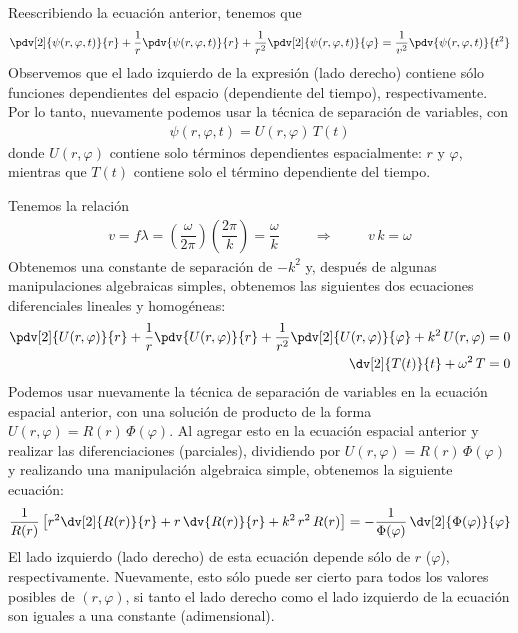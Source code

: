 Reescribiendo la ecuación anterior, tenemos que
\begin{align*}
\pdv[2]{\psi (r, \varphi, t)}{r} + \dfrac{1}{r} \pdv{\psi (r, \varphi, t)}{r} + \dfrac{1}{r^{2}} \pdv[2]{\psi (r, \varphi, t)}{\varphi} = \dfrac{1}{v^{2}} \pdv{\psi (r, \varphi, t)}{t^{2}}
\end{align*}
Observemos que el lado izquierdo de la expresión (lado derecho) contiene sólo funciones dependientes del espacio (dependiente del tiempo), respectivamente. Por lo tanto, nuevamente podemos usar la técnica de separación de variables, con
\begin{align*}
\psi (r, \varphi, t) = U(r, \varphi) \, T(t)
\end{align*}
donde $U(r, \varphi)$ contiene solo términos dependientes espacialmente: $r$ y $\varphi$, mientras que $T (t)$ contiene solo el término dependiente del tiempo.
\par
Tenemos la relación 
\begin{align*}
v = f \lambda = \left( \dfrac{\omega}{2 \pi} \right) \left( \dfrac{2 \pi}{k} \right) = \dfrac{\omega}{k} \hspace{1cm} \Longrightarrow \hspace{1cm} v \, k = \omega
\end{align*}
Obtenemos una constante de separación de $-k^{2}$ y, después de algunas manipulaciones algebraicas simples, obtenemos las siguientes dos ecuaciones diferenciales lineales y homogéneas:
\begin{align*}
\pdv[2]{U (r, \varphi)}{r} + \dfrac{1}{r} \pdv{U (r, \varphi)}{r} + \dfrac{1}{r^{2}} \pdv[2]{U (r, \varphi)}{\varphi} + k^{2} \, U (r, \varphi) &= 0 \\
\dv[2]{T(t)}{t} + \omega^{2} \, T &= 0 
\end{align*}
Podemos usar nuevamente la técnica de separación de variables en la ecuación espacial anterior, con una solución de producto de la forma $U (r, \varphi) = R (r) \, \Phi (\varphi)$. Al agregar esto en la ecuación espacial anterior y realizar las diferenciaciones (parciales), dividiendo por $U (r, \varphi) = R (r) \, \Phi (\varphi)$ y realizando una manipulación algebraica simple, obtenemos la siguiente ecuación:
\begin{align*}
\dfrac{1}{R(r)} \left[ r^{2} \dv[2]{R(r)}{r} + r \, \dv{R(r)}{r} + k^{2} \, r^{2} \, R(r) \right] = - \dfrac{1}{\Phi(\varphi)} \, \dv[2]{\Phi(\varphi)}{\varphi}
\end{align*}
El lado izquierdo (lado derecho) de esta ecuación depende sólo de $r$ ($\varphi$), respectivamente. Nuevamente, esto sólo puede ser cierto para todos los valores posibles de $(r, \varphi)$, si tanto el lado derecho como el lado izquierdo de la ecuación son iguales a una constante (adimensional).
